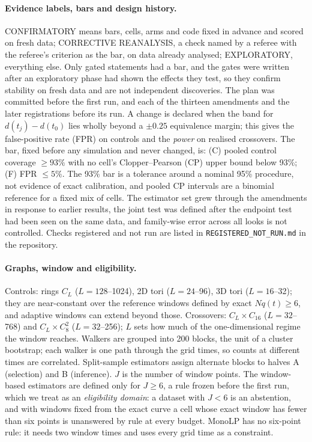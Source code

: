 \documentclass[aps,pre,twocolumn,superscriptaddress,nofootinbib,10pt]{revtex4-2}
\newcommand{\nm}[1]{\textsf{#1}}
\newcommand{\MLP}{\nm{MonoLP}}
\begin{document}
\paragraph*{Evidence labels, bars and design history.}
CONFIRMATORY means bars, cells, arms and code fixed in advance and scored on fresh data; CORRECTIVE REANALYSIS, a check named by a referee with the referee's criterion as the bar, on data already analysed; EXPLORATORY, everything else. Only gated statements had a bar, and the gates were written after an exploratory phase had shown the effects they test, so they confirm stability on fresh data and are not independent discoveries. The plan was committed before the first run, and each of the thirteen amendments and the later registrations before its run. A change is declared when the band for $d(t_j)-d(t_0)$ lies wholly beyond a $\pm0.25$ equivalence margin; this gives the false-positive rate (FPR) on controls and the \emph{power} on realised crossovers. The bar, fixed before any simulation and never changed, is: (C) pooled control coverage $\ge93\%$ with no cell's Clopper--Pearson (CP) upper bound below 93\%; (F) FPR $\le5\%$. The 93\% bar is a tolerance around a nominal 95\% procedure, not evidence of exact calibration, and pooled CP intervals are a binomial reference for a fixed mix of cells. The estimator set grew through the amendments in response to earlier results, the joint test was defined after the endpoint test had been seen on the same data, and family-wise error across all looks is not controlled. Checks registered and not run are listed in \texttt{REGISTERED\_NOT\_RUN.md} in the repository.

\paragraph*{Graphs, window and eligibility.}
Controls: rings $C_L$ ($L=128$--1024), 2D tori ($L=24$--96), 3D tori ($L=16$--32); they are near-constant over the reference windows defined by exact $Nq(t)\ge6$, and adaptive windows can extend beyond those. Crossovers: $C_L\times C_{16}$ ($L=32$--768) and $C_L\times C_8^2$ ($L=32$--256); $L$ sets how much of the one-dimensional regime the window reaches. Walkers are grouped into 200 blocks, the unit of a cluster bootstrap; each walker is one path through the grid times, so counts at different times are correlated. Split-sample estimators assign alternate blocks to halves A (selection) and B (inference). $J$ is the number of window points. The window-based estimators are defined only for $J\ge6$, a rule frozen before the first run, which we treat as an \emph{eligibility domain}: a dataset with $J<6$ is an abstention, and with windows fixed from the exact curve a cell whose exact window has fewer than six points is unanswered by rule at every budget. \MLP{} has no six-point rule: it needs two window times and uses every grid time as a constraint.
\end{document}
